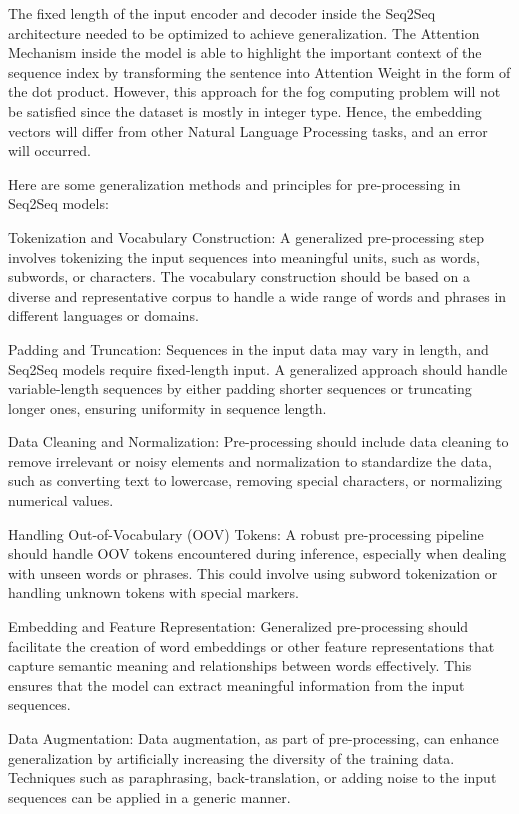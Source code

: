 \documentclass[conference]{IEEEtran}
\begin{document}
The fixed length of the input encoder and decoder inside the Seq2Seq architecture needed to be optimized to achieve generalization. The Attention Mechanism inside the model is able to highlight the important context of the sequence index by transforming the sentence into Attention Weight in the form of the dot product. However, this approach for the fog computing problem will not be satisfied since the dataset is mostly in integer type. Hence, the embedding vectors will differ from other Natural Language Processing tasks, and an error will occurred. 

Here are some generalization methods and principles for pre-processing in Seq2Seq models:

    Tokenization and Vocabulary Construction: A generalized pre-processing step involves tokenizing the input sequences into meaningful units, such as words, subwords, or characters. The vocabulary construction should be based on a diverse and representative corpus to handle a wide range of words and phrases in different languages or domains.

    Padding and Truncation: Sequences in the input data may vary in length, and Seq2Seq models require fixed-length input. A generalized approach should handle variable-length sequences by either padding shorter sequences or truncating longer ones, ensuring uniformity in sequence length.

    Data Cleaning and Normalization: Pre-processing should include data cleaning to remove irrelevant or noisy elements and normalization to standardize the data, such as converting text to lowercase, removing special characters, or normalizing numerical values.

    Handling Out-of-Vocabulary (OOV) Tokens: A robust pre-processing pipeline should handle OOV tokens encountered during inference, especially when dealing with unseen words or phrases. This could involve using subword tokenization or handling unknown tokens with special markers.

    Embedding and Feature Representation: Generalized pre-processing should facilitate the creation of word embeddings or other feature representations that capture semantic meaning and relationships between words effectively. This ensures that the model can extract meaningful information from the input sequences.

    Data Augmentation: Data augmentation, as part of pre-processing, can enhance generalization by artificially increasing the diversity of the training data. Techniques such as paraphrasing, back-translation, or adding noise to the input sequences can be applied in a generic manner.
\end{document}
